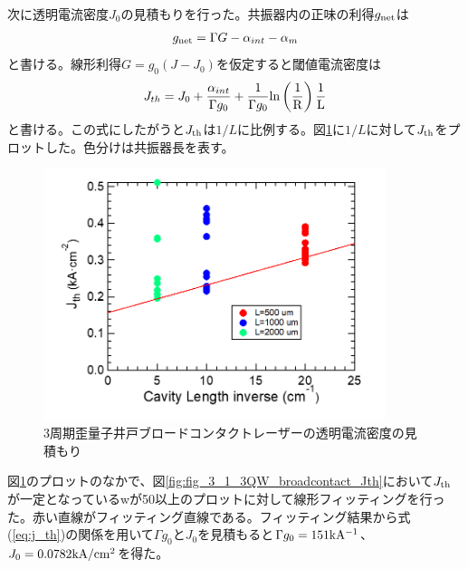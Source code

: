 {次に透明電流密度$J_{0}$の見積もりを行った。共振器内の正味の利得$g_{\rm{net}}$は
\begin{eqnarray}
g_{\rm{net}}=\Gamma G-\alpha_{int}-\alpha_{m}
\label{eq:eta_j0}
\end{eqnarray}
と書ける。線形利得$G=g_{0}(J-J_{0})$を仮定すると閾値電流密度は
\begin{eqnarray}
J_{th}=J_{0}+\dfrac{\alpha_{int}}{\Gamma g_{0}}+\dfrac{1}{\Gamma g_{0}}\rm{ln}\left(\dfrac{1}{R}\right)\dfrac{1}{L}
\label{eq:j_th}
\end{eqnarray}
と書ける。この式にしたがうと$J_{\rm{th}}$は$1/L$に比例する。図\ref{fig:fig_3_1_3QW_broadcontact_j0}に$1/L$に対して$J_{\rm{th}}$をプロットした。色分けは共振器長を表す。
\begin{figure}[h]
	\centering
	\includegraphics[width=10cm]{figure/fig_3_1_3QW_broadcontact_j0.png}
	\caption{3周期歪量子井戸ブロードコンタクトレーザーの透明電流密度の見積もり}
	\label{fig:fig_3_1_3QW_broadcontact_j0}
\end{figure}
図\ref{fig:fig_3_1_3QW_broadcontact_j0}のプロットのなかで、図\ref{fig:fig_3_1_3QW_broadcontact_Jth}において$J_{\rm{th}}$が一定となっているwが50以上のプロットに対して線形フィッティングを行った。赤い直線がフィッティング直線である。フィッティング結果から式(\ref{eq:j_th})の関係を用いて$\Gamma g_{0}$と$J_{0}$を見積もると$\Gamma g_{0}=151              \rm{ kA^{-1}}$、$J_{0}=0.0782 \rm{kA/cm^{2}}$を得た。


}
